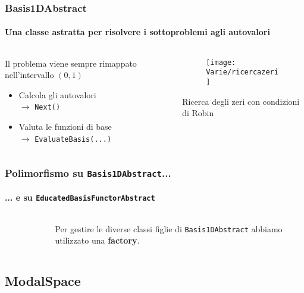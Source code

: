 \begin{frame}
 \frametitle{Basis1DAbstract}
 \framesubtitle{Una classe astratta per risolvere i sottoproblemi agli autovalori}
 \begin{columns}
  \begin{column}{0.5\textwidth}
  Il problema viene sempre rimappato nell'intervallo $(0,1)$
 \begin{itemize}
  \item Calcola gli autovalori\\$\rightarrow$ \texttt{Next()}
  \item Valuta le funzioni di base\\$\rightarrow$ \texttt{EvaluateBasis(...)}
 \end{itemize}
  \end{column}
\begin{column}{0.5\textwidth}
 \begin{figure}
  \centering
  \texttt{[image: Varie/ricercazeri]}
 \end{figure}
\begin{center}Ricerca degli zeri con condizioni di Robin\end{center}
\end{column}
 \end{columns}
\end{frame}
\begin{frame}
 \frametitle{Polimorfismo su \texttt{Basis1DAbstract}...}
 \framesubtitle{... e su \texttt{EducatedBasisFunctorAbstract}}
 \begin{columns}
  \begin{column}{0.5\textwidth}
 \begin{figure}
  \centering
  {}
 \end{figure}
  \end{column}
  \begin{column}{0.5\textwidth}
   Per gestire le diverse classi figlie di \texttt{Basis1DAbstract} abbiamo utilizzato una \textbf{factory}.
  \end{column}
 \end{columns}
\end{frame}

\subsection{ModalSpace}

\begin{frame}
\end{frame}


